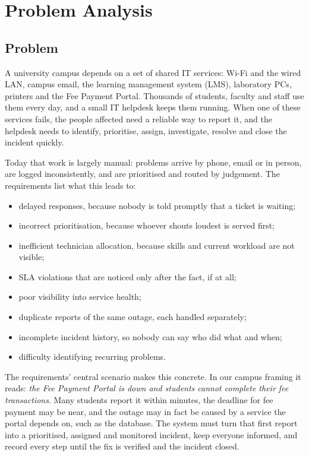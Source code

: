 \chapter{Problem Analysis}\label{ch:problem}

\section{Problem}

A university campus depends on a set of shared IT services: Wi-Fi and the wired LAN, campus
email, the learning management system (LMS), laboratory PCs, printers and the Fee Payment
Portal. Thousands of students, faculty and staff use them every day, and a small IT helpdesk
keeps them running. When one of these services fails, the people affected need a reliable way
to report it, and the helpdesk needs to identify, prioritise, assign, investigate, resolve and
close the incident quickly.

Today that work is largely manual: problems arrive by phone, email or in person, are logged
inconsistently, and are prioritised and routed by judgement. The requirements list what this
leads to:

\begin{itemize}
  \item delayed responses, because nobody is told promptly that a ticket is waiting;
  \item incorrect prioritisation, because whoever shouts loudest is served first;
  \item inefficient technician allocation, because skills and current workload are not visible;
  \item SLA violations that are noticed only after the fact, if at all;
  \item poor visibility into service health;
  \item duplicate reports of the same outage, each handled separately;
  \item incomplete incident history, so nobody can say who did what and when;
  \item difficulty identifying recurring problems.
\end{itemize}

The requirements' central scenario makes this concrete. In our campus framing it reads:
\emph{the Fee Payment Portal is down and students cannot complete their fee transactions}.
Many students report it within minutes, the deadline for fee payment may be near, and the
outage may in fact be caused by a service the portal depends on, such as the database. The
system must turn that first report into a prioritised, assigned and monitored incident, keep
everyone informed, and record every step until the fix is verified and the incident closed.

